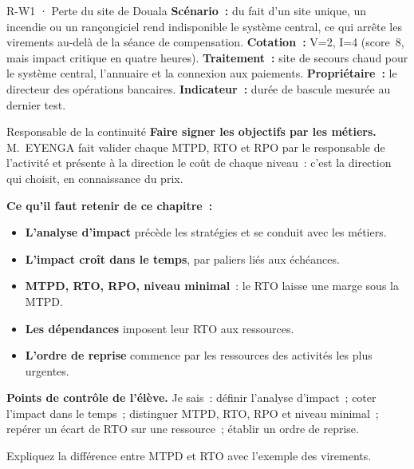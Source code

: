 \begin{boxobjet}{R-W1 · Perte du site de Douala}
\textbf{Scénario~:} du fait d'un site unique, un incendie ou un
rançongiciel rend indisponible le système central, ce qui arrête les
virements au-delà de la séance de compensation. \textbf{Cotation~:}
V=2, I=4 (score~8, mais impact critique en quatre heures).
\textbf{Traitement~:} site de secours chaud pour le système central,
l'annuaire et la connexion aux paiements. \textbf{Propriétaire~:} le
directeur des opérations bancaires. \textbf{Indicateur~:} durée de bascule
mesurée au dernier test.
\end{boxobjet}

\begin{boxmetier}{Responsable de la continuité}
\textbf{Faire signer les objectifs par les métiers.} M.~EYENGA fait valider
chaque MTPD, RTO et RPO par le responsable de l'activité et présente à la
direction le coût de chaque niveau~: c'est la direction qui choisit, en
connaissance du prix.
\end{boxmetier}

\separateur

\begin{boxresume}
\textbf{Ce qu'il faut retenir de ce chapitre~:}
\begin{itemize}
    \item \textbf{L'analyse d'impact} précède les stratégies et se conduit
          avec les métiers.
    \item \textbf{L'impact croît dans le temps}, par paliers liés aux
          échéances.
    \item \textbf{MTPD, RTO, RPO, niveau minimal}~: le RTO laisse une marge
          sous la MTPD.
    \item \textbf{Les dépendances} imposent leur RTO aux ressources.
    \item \textbf{L'ordre de reprise} commence par les ressources des
          activités les plus urgentes.
\end{itemize}
\end{boxresume}

\begin{boxinfo}
\textbf{Points de contrôle de l'élève.} Je sais~: définir l'analyse
d'impact~; coter l'impact dans le temps~; distinguer MTPD, RTO, RPO et
niveau minimal~; repérer un écart de RTO sur une ressource~; établir un
ordre de reprise.
\end{boxinfo}

\bigskip

\begin{boxexo}[title={\ding{45}\quad Exercice~17.1. Définitions \niveaubase}]
Expliquez la différence entre MTPD et RTO avec l'exemple des virements.
\end{boxexo}

